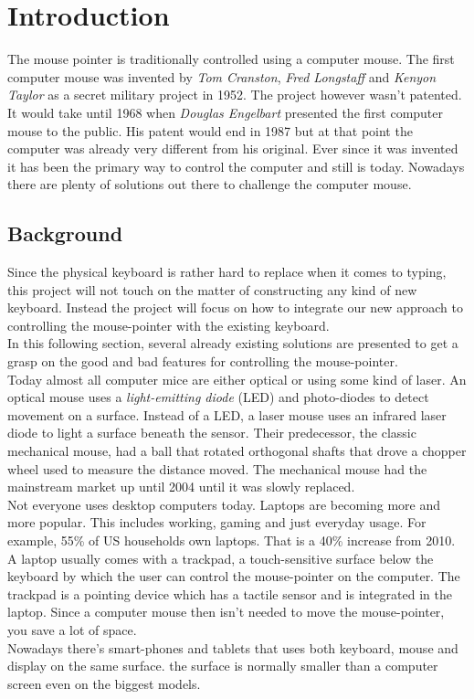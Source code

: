 \chapter{Introduction}
The mouse pointer is traditionally controlled using a computer mouse.
The first computer mouse was invented by \emph{Tom Cranston}, \emph{Fred Longstaff} and 
\emph{Kenyon Taylor} as a secret military project in 1952. The project however wasn't 
patented. It would take until 1968 when \emph{Douglas Engelbart} presented the 
first computer mouse to the public. His patent would end in 1987 but at that point the 
computer was already very different from his original. Ever since
it was invented it has been the primary way to control the computer and still is today. Nowadays
there are plenty of solutions out there to challenge the computer mouse.\cite{Mouse40} \cite{Pioneers}

\section{Background}
Since the physical keyboard is rather hard to replace when it comes to typing, this project
will not touch on the matter of constructing any kind of new keyboard. Instead the project
will focus on how to integrate our new approach to controlling the mouse-pointer with the existing
keyboard.\\
In this following section, several already existing solutions are presented to get a grasp
on the good and bad features for controlling the mouse-pointer.\\
Today almost all computer mice are either optical or using some kind of laser. An optical
mouse uses a \emph{light-emitting diode} (LED) and photo-diodes to detect movement on a
surface. Instead of a LED, a laser mouse uses an infrared laser diode to light a surface
beneath the sensor. Their predecessor, the classic mechanical mouse, had a ball that rotated
orthogonal shafts that drove a chopper wheel used to measure the distance moved. The mechanical
mouse had the mainstream market up until 2004 until it was slowly replaced.\\
Not everyone uses desktop computers today. Laptops are becoming more and more popular.
This includes working, gaming and just everyday usage. For example, 55\% of US households
own laptops. That is a 40\% increase from 2010.\\
A laptop usually comes with a trackpad, a touch-sensitive surface below the keyboard
by which the user can control the mouse-pointer on the computer.
The trackpad is a pointing device which has a tactile sensor and is
integrated in the laptop. Since a computer mouse then isn't needed to move
the mouse-pointer, you save a lot of space.\\
Nowadays there's smart-phones and tablets that uses both keyboard, mouse
and display on the same surface. the surface is normally smaller than a computer screen
even on the biggest models.

